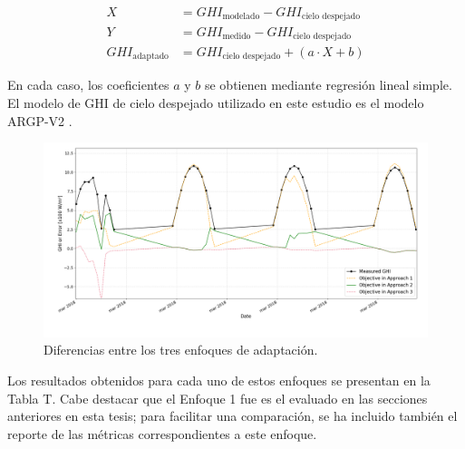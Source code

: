 \begin{align}
X &= GHI_{\text{modelado}} - GHI_{\text{cielo despejado}} \\
Y &= GHI_{\text{medido}} - GHI_{\text{cielo despejado}} \\
GHI_{\text{adaptado}} &= GHI_{\text{cielo despejado}} + (a \cdot X + b)
\label{eq:approach3}
\end{align}

En cada caso, los coeficientes $a$ y $b$ se obtienen mediante regresión lineal simple. El modelo de GHI de cielo despejado utilizado en este estudio es el modelo ARGP-V2 \cite{Ledesma2023a}.

\begin{figure}[ht!]
\centering
\includegraphics[width=\textwidth]{figuras/approaches.png}
\caption{Diferencias entre los tres enfoques de adaptación.}
\label{fig:approaches}
\end{figure}



Los resultados obtenidos para cada uno de estos enfoques se presentan en la Tabla T. Cabe destacar que el Enfoque 1 fue es el evaluado en las secciones anteriores en esta tesis; para facilitar una comparación, se ha incluido también el reporte de las métricas correspondientes a este enfoque.





